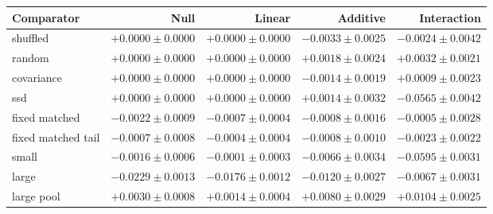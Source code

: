\begin{tabular}{lrrrr}
\toprule
Comparator & Null & Linear & Additive & Interaction \\
\midrule
shuffled & $+0.0000\pm0.0000$ & $+0.0000\pm0.0000$ & $-0.0033\pm0.0025$ & $-0.0024\pm0.0042$ \\
random & $+0.0000\pm0.0000$ & $+0.0000\pm0.0000$ & $+0.0018\pm0.0024$ & $+0.0032\pm0.0021$ \\
covariance & $+0.0000\pm0.0000$ & $+0.0000\pm0.0000$ & $-0.0014\pm0.0019$ & $+0.0009\pm0.0023$ \\
ssd & $+0.0000\pm0.0000$ & $+0.0000\pm0.0000$ & $+0.0014\pm0.0032$ & $-0.0565\pm0.0042$ \\
fixed matched & $-0.0022\pm0.0009$ & $-0.0007\pm0.0004$ & $-0.0008\pm0.0016$ & $-0.0005\pm0.0028$ \\
fixed matched tail & $-0.0007\pm0.0008$ & $-0.0004\pm0.0004$ & $-0.0008\pm0.0010$ & $-0.0023\pm0.0022$ \\
small & $-0.0016\pm0.0006$ & $-0.0001\pm0.0003$ & $-0.0066\pm0.0034$ & $-0.0595\pm0.0031$ \\
large & $-0.0229\pm0.0013$ & $-0.0176\pm0.0012$ & $-0.0120\pm0.0027$ & $-0.0067\pm0.0031$ \\
large pool & $+0.0030\pm0.0008$ & $+0.0014\pm0.0004$ & $+0.0080\pm0.0029$ & $+0.0104\pm0.0025$ \\
\bottomrule
\end{tabular}